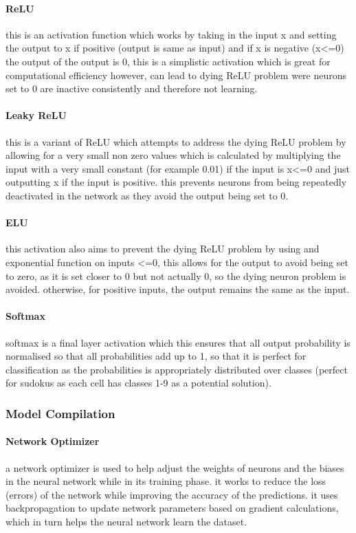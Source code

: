 \documentclass[]{final_report}
\begin{document}
\paragraph{ReLU}
this is an activation function which works by taking in the input x and setting the output to x if positive (output is same as input) and if x is negative (x<=0) the output of the output is 0, this is a simplistic activation which is great for computational efficiency however, can lead to dying ReLU problem were neurons set to 0 are inactive consistently and therefore not learning.

\paragraph{Leaky ReLU}
this is a variant of ReLU which attempts to address the dying ReLU problem by allowing for a very small non zero values which is calculated by multiplying the input with a very small constant (for example 0.01) if the input is x<=0 and just outputting x if the input is positive. this prevents neurons from being repeatedly deactivated in the network as they avoid the output being set to 0.

\paragraph{ELU}
this activation also aims to prevent the dying ReLU problem by using and exponential function on inputs <=0, this allows for the output to avoid being set to zero, as it is set closer to 0 but not actually 0, so the dying neuron problem is avoided. otherwise, for positive inputs, the output remains the same as the input.

\paragraph{Softmax}
softmax is a final layer activation which this ensures that all output probability is normalised so that all probabilities add up to 1, so that it is perfect for classification as the probabilities is appropriately distributed over classes (perfect for sudokus as each cell has classes 1-9 as a potential solution).

\subsubsection{Model Compilation}

\paragraph{Network Optimizer}
a network optimizer is used to help adjust the weights of neurons and the biases in the neural network while in its training phase. it works to reduce the loss (errors) of the network while improving the accuracy of the predictions. it uses backpropagation to update network parameters based on gradient calculations, which in turn helps the neural network learn the dataset.
\end{document}
